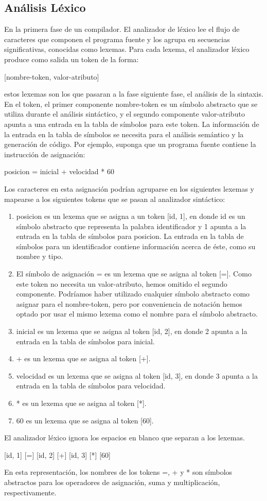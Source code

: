 \subsection{Análisis Léxico}
En la primera fase de un compilador. El analizador de léxico lee el flujo de caracteres que componen el programa fuente y los agrupa en secuencias significativas, conocidas como lexemas. Para cada lexema, el analizador léxico produce como salida un token de la forma:
\begin{center}
[nombre-token, valor-atributo]
\end{center}
estos lexemas son los que pasaran a la fase siguiente fase, el análisis de la sintaxis. En el token, el primer componente nombre-token es un símbolo abstracto que se utiliza durante el análisis sintáctico, y el segundo componente valor-atributo apunta a una entrada en la tabla de símbolos para este token. La información de la entrada en la tabla de símbolos se necesita para el análisis semántico y la generación de código.
Por ejemplo, suponga que un programa fuente contiene la instrucción de asignación:
\begin{center}
    posicion = inicial + velocidad * 60
\end{center}
Los caracteres en esta asignación podrían agruparse en los siguientes lexemas y mapearse a los siguientes tokens que se pasan al analizador sintáctico:
\begin{enumerate}
    \item posicion es un lexema que se asigna a un token [id, 1], en donde id es un símbolo abstracto que representa la palabra identificador y 1 apunta a la entrada en la tabla de símbolos para posicion. La entrada en la tabla de símbolos para un identificador contiene información acerca de éste, como su nombre y tipo.
    \item  El símbolo de asignación = es un lexema que se asigna al token [=]. Como este token no necesita un valor-atributo, hemos omitido el segundo componente. Podríamos haber utilizado cualquier símbolo abstracto como asignar para el nombre-token, pero por conveniencia de notación hemos optado por usar el mismo lexema como el nombre para el símbolo abstracto.
    \item inicial es un lexema que se asigna al token [id, 2], en donde 2 apunta a la entrada en la tabla de símbolos para inicial.
    \item + es un lexema que se asigna al token [+].
    \item velocidad es un lexema que se asigna al token [id, 3], en donde 3 apunta a la entrada en la tabla de símbolos para velocidad.
    \item * es un lexema que se asigna al token [*].
    \item 60 es un lexema que se asigna al token [60].
\end{enumerate}
El analizador léxico ignora los espacios en blanco que separan a los lexemas.
\begin{center}
[id, 1] [=] [id, 2] [+] [id, 3] [*] [60] 
\end{center}
En esta representación, los nombres de los tokens =, + y * son símbolos abstractos para los operadores de asignación, suma y multiplicación, respectivamente.
